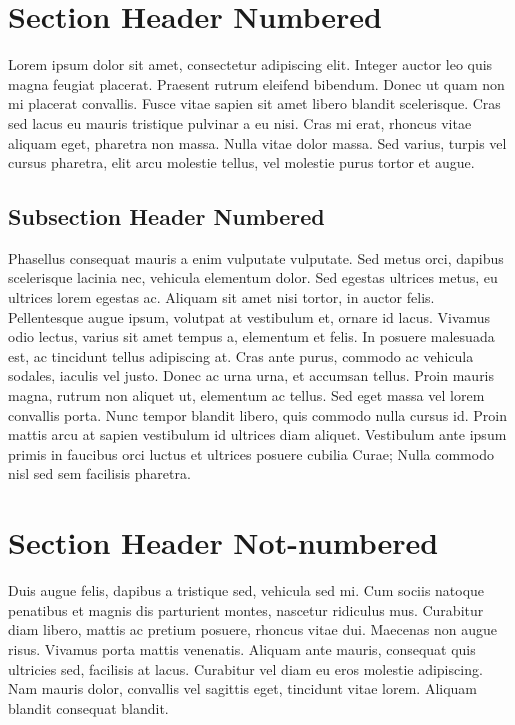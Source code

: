 \documentclass[]{article}
\begin{document}
	
	
	\thispagestyle{empty}
	\section{Section Header Numbered}
		Lorem ipsum dolor sit amet, consectetur adipiscing elit. Integer auctor leo quis magna feugiat placerat. Praesent rutrum eleifend bibendum. Donec ut quam non mi placerat convallis. Fusce vitae sapien sit amet libero blandit scelerisque. Cras sed lacus eu mauris tristique pulvinar a eu nisi. Cras mi erat, rhoncus vitae aliquam eget, pharetra non massa. Nulla vitae dolor massa. Sed varius, turpis vel cursus pharetra, elit arcu molestie tellus, vel molestie purus tortor et augue.
		
		\subsection{Subsection Header Numbered}
			Phasellus consequat mauris a enim vulputate vulputate. Sed metus orci, dapibus scelerisque lacinia nec, vehicula elementum dolor. Sed egestas ultrices metus, eu ultrices lorem egestas ac. Aliquam sit amet nisi tortor, in auctor felis. Pellentesque augue ipsum, volutpat at vestibulum et, ornare id lacus. Vivamus odio lectus, varius sit amet tempus a, elementum et felis. In posuere malesuada est, ac tincidunt tellus adipiscing at. Cras ante purus, commodo ac vehicula sodales, iaculis vel justo. Donec ac urna urna, et accumsan tellus. Proin mauris magna, rutrum non aliquet ut, elementum ac tellus. Sed eget massa vel lorem convallis porta. Nunc tempor blandit libero, quis commodo nulla cursus id. Proin mattis arcu at sapien vestibulum id ultrices diam aliquet. Vestibulum ante ipsum primis in faucibus orci luctus et ultrices posuere cubilia Curae; Nulla commodo nisl sed sem facilisis pharetra.
			
	\section*{Section Header Not-numbered}
		Duis augue felis, dapibus a tristique sed, vehicula sed mi. Cum sociis natoque penatibus et magnis dis parturient montes, nascetur ridiculus mus. Curabitur diam libero, mattis ac pretium posuere, rhoncus vitae dui. Maecenas non augue risus. Vivamus porta mattis venenatis. Aliquam ante mauris, consequat quis ultricies sed, facilisis at lacus. Curabitur vel diam eu eros molestie adipiscing. Nam mauris dolor, convallis vel sagittis eget, tincidunt vitae lorem. Aliquam blandit consequat blandit.
		
\end{document}
